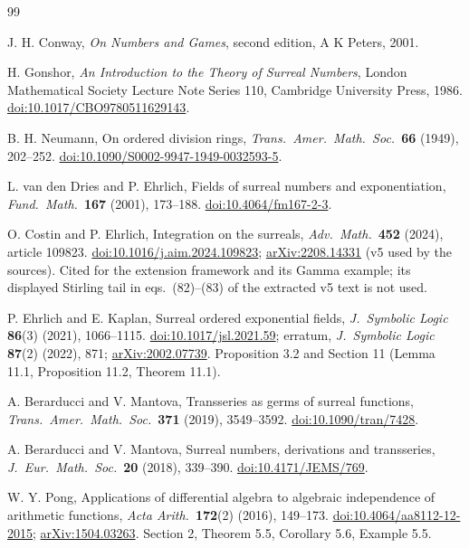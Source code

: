 \documentclass[11pt,a4paper]{article}
\numberwithin{equation}{section}
\theoremstyle{definition}
\theoremstyle{remark}
\begin{document}
\begin{thebibliography}{99}
\small
\raggedright
\setlength{\itemsep}{3pt}

J. H. Conway, \emph{On Numbers and Games}, second edition, A K Peters, 2001.

H. Gonshor, \emph{An Introduction to the Theory of Surreal Numbers}, London
Mathematical Society Lecture Note Series 110, Cambridge University Press,
1986. \href{https://doi.org/10.1017/CBO9780511629143}{doi:10.1017/CBO9780511629143}.

B. H. Neumann, On ordered division rings, \emph{Trans.\ Amer.\ Math.\ Soc.}\
\textbf{66} (1949), 202--252.
\href{https://doi.org/10.1090/S0002-9947-1949-0032593-5}{doi:10.1090/S0002-9947-1949-0032593-5}.

L. van den Dries and P. Ehrlich, Fields of surreal numbers and exponentiation,
\emph{Fund.\ Math.}\ \textbf{167} (2001), 173--188.
\href{https://doi.org/10.4064/fm167-2-3}{doi:10.4064/fm167-2-3}.

O. Costin and P. Ehrlich, Integration on the surreals, \emph{Adv.\ Math.}\
\textbf{452} (2024), article 109823.
\href{https://doi.org/10.1016/j.aim.2024.109823}{doi:10.1016/j.aim.2024.109823};
\href{https://arxiv.org/abs/2208.14331}{arXiv:2208.14331} (v5 used by the
sources). Cited for the extension framework and its Gamma example; its
displayed Stirling tail in eqs.\ (82)--(83) of the extracted v5 text is not used.

\bibitem{EK}
P. Ehrlich and E. Kaplan, Surreal ordered exponential fields, \emph{J.\ Symbolic
Logic} \textbf{86}(3) (2021), 1066--1115.
\href{https://doi.org/10.1017/jsl.2021.59}{doi:10.1017/jsl.2021.59}; erratum,
\emph{J.\ Symbolic Logic} \textbf{87}(2) (2022), 871;
\href{https://arxiv.org/abs/2002.07739}{arXiv:2002.07739}. Proposition 3.2
and Section 11 (Lemma 11.1, Proposition 11.2, Theorem 11.1).

A. Berarducci and V. Mantova, Transseries as germs of surreal functions,
\emph{Trans.\ Amer.\ Math.\ Soc.}\ \textbf{371} (2019), 3549--3592.
\href{https://doi.org/10.1090/tran/7428}{doi:10.1090/tran/7428}.

\bibitem{BMder}
A. Berarducci and V. Mantova, Surreal numbers, derivations and transseries,
\emph{J.\ Eur.\ Math.\ Soc.}\ \textbf{20} (2018), 339--390.
\href{https://doi.org/10.4171/JEMS/769}{doi:10.4171/JEMS/769}.

W. Y. Pong, Applications of differential algebra to algebraic independence of
arithmetic functions, \emph{Acta Arith.}\ \textbf{172}(2) (2016), 149--173.
\href{https://doi.org/10.4064/aa8112-12-2015}{doi:10.4064/aa8112-12-2015};
\href{https://arxiv.org/abs/1504.03263}{arXiv:1504.03263}. Section 2,
Theorem 5.5, Corollary 5.6, Example 5.5.


\end{thebibliography}
\end{document}
